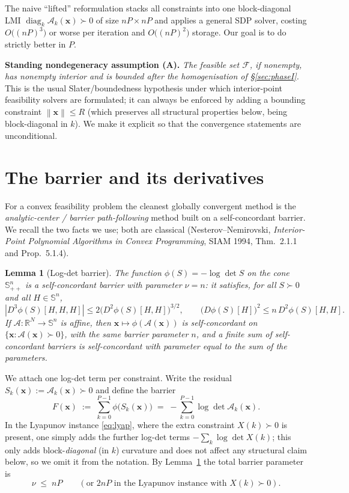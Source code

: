 \documentclass{amsart}
\newtheorem{lemma}{Lemma}
\newcommand{\Sym}{\mathbb{S}}
\newcommand{\R}{\mathbb{R}}
\newcommand{\diag}{\operatorname{diag}}
\newcommand{\norm}[1]{\left\lVert#1\right\rVert}
\begin{document}
The naive ``lifted'' reformulation stacks all constraints into one block-diagonal
LMI $\diag_k\mathcal A_k(\bm x)\succ0$ of size $nP\times nP$ and applies a general
SDP solver, costing $O\!\big((nP)^3\big)$ or worse per iteration and
$O\!\big((nP)^2\big)$ storage. Our goal is to do strictly better in $P$.

\medskip
\noindent\textbf{Standing nondegeneracy assumption (A).}
\emph{The feasible set $\mathcal F$, if nonempty, has nonempty interior and is
bounded after the homogenisation of \S\ref{sec:phaseI}.} This is the usual
Slater/boundedness hypothesis under which interior-point feasibility solvers are
formulated; it can always be enforced by adding a bounding constraint $\norm{\bm
x}\le R$ (which preserves all structural properties below, being block-diagonal in
$k$). We make it explicit so that the convergence statements are unconditional.

\section{The barrier and its derivatives}\label{sec:barrier}

For a convex feasibility problem the cleanest globally convergent method is the
\emph{analytic-center / barrier path-following} method built on a self-concordant
barrier. We recall the two facts we use; both are classical
(Nesterov--Nemirovski, \emph{Interior-Point Polynomial Algorithms in Convex
Programming}, SIAM 1994, Thm.~2.1.1 and Prop.~5.1.4).

\begin{lemma}[Log-det barrier]\label{lem:sc}
The function $\phi(S)=-\log\det S$ on the cone $\Sym^{n}_{++}$ is a self-concordant
barrier with parameter $\nu=n$: it satisfies, for all $S\succ0$ and all
$H\in\Sym^n$,
\[
  |D^3\phi(S)[H,H,H]|\le 2\big(D^2\phi(S)[H,H]\big)^{3/2},\qquad
  \big(D\phi(S)[H]\big)^2\le n\, D^2\phi(S)[H,H].
\]
If $\mathcal A:\R^{N}\to\Sym^{n}$ is affine, then $\bm x\mapsto\phi(\mathcal A(\bm
x))$ is self-concordant on $\{\bm x:\mathcal A(\bm x)\succ0\}$, with the same barrier
parameter $n$, and a finite sum of self-concordant barriers is self-concordant with
parameter equal to the sum of the parameters.
\end{lemma}

We attach one log-det term per constraint. Write the residual
$S_k(\bm x):=\mathcal A_k(\bm x)\succ0$ and define the barrier
\begin{equation}\label{eq:barrier}
  F(\bm x)\;:=\;\sum_{k=0}^{P-1} \phi\big(S_k(\bm x)\big)
            \;=\;-\sum_{k=0}^{P-1}\log\det\mathcal A_k(\bm x).
\end{equation}
In the Lyapunov instance \eqref{eq:lyap}, where the extra constraint $X(k)\succ0$ is
present, one simply adds the further log-det terms $-\sum_k\log\det X(k)$; this only
adds block-\emph{diagonal} (in $k$) curvature and does not affect any structural
claim below, so we omit it from the notation. By Lemma~\ref{lem:sc} the total
barrier parameter is
\begin{equation}\label{eq:nu}
  \nu\;\le\;nP\qquad(\text{or }2nP\text{ in the Lyapunov instance with }X(k)\succ0).
\end{equation}
\end{document}
